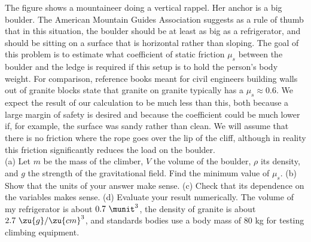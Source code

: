 The figure shows a mountaineer doing a vertical rappel. Her anchor is a big
boulder. The
American Mountain Guides Association suggests as a rule of thumb that in
this situation, the boulder should be at least as big as a refrigerator,
and should be sitting on a surface that is horizontal rather than sloping.
The goal of this problem is to estimate what coefficient of static friction
$\mu_s$ between the boulder and the
ledge
is required if this setup is to hold the person's body weight. For comparison, reference books
meant for civil engineers building walls out of granite blocks state that
granite on granite typically has a $\mu_s\approx 0.6$. We expect the result of
our calculation to be much less than this, both because a large margin of safety
is desired and because the coefficient could be much lower if, for example, the
surface was sandy rather than clean. We will assume that there is no friction where the rope goes over the
lip of the cliff, although in reality this friction significantly reduces the load on the
boulder.\\
%
(a) Let $m$ be the mass of the climber, $V$
the volume of the boulder, $\rho$ its density, and $g$ the strength of the gravitational
field. Find the minimum value of $\mu_s$. \answercheck\hwendpart
%
(b) Show that the units of your answer make sense.\hwendpart
%
(c) Check that its dependence on the variables makes sense.\hwendpart
%
(d) Evaluate your result numerically. The volume of my refrigerator is about $0.7\ \munit^3$,
the density of granite is about $2.7\ \zu{g}/\zu{cm}^3$, and standards bodies use a body mass
of 80 kg for testing climbing equipment.\answercheck\hwendpart
